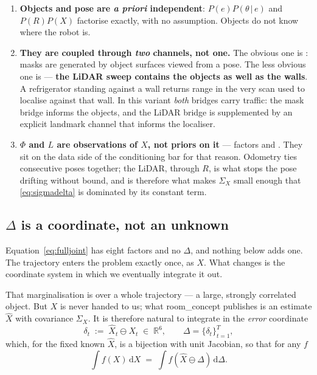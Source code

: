 \documentclass[11pt,a4paper]{report}
\newcommand{\given}{\,|\,}
\newcommand{\R}{\mathbb{R}}
\theoremstyle{definition}   %
\begin{document}
\begin{enumerate}[label=(\alph*),leftmargin=1.9em]
\item \textbf{Objects and pose are \emph{a priori} independent}: $P(e)P(\theta\given e)$ and
      $P(R)P(X)$ factorise exactly, with no assumption. Objects do not know where the robot is.
\item \textbf{They are coupled through \emph{two} channels, not one.} The obvious one is
      : masks are generated by object surfaces viewed from a pose. The less obvious one
      is  --- \textbf{the LiDAR sweep contains the objects as well as the walls}. A
      refrigerator standing against a wall returns range in the very scan used to localise
      against that wall. In this variant \emph{both} bridges carry traffic: the mask bridge
      informs the objects, and the LiDAR bridge is supplemented by an explicit landmark channel
      that informs the localiser.
\item \textbf{$\Phi$ and $L$ are observations of $X$, not priors on it} --- factors 
      and . They sit on the data side of the conditioning bar for that reason. Odometry
      ties consecutive poses together; the LiDAR, through $R$, is what stops the pose drifting
      without bound, and is therefore what makes $\Sigma_X$ small enough that
      \eqref{eq:sigmadelta} is dominated by its constant term.
\end{enumerate}

\subsection{$\Delta$ is a coordinate, not an unknown}
\label{sec:deltaisx}

Equation~\eqref{eq:fulljoint} has eight factors and no $\Delta$, and nothing below adds one. The
trajectory enters the problem exactly once, as $X$. What changes is the coordinate system in
which we eventually integrate it out.

That marginalisation is over a whole trajectory --- a large, strongly correlated object. But $X$
is never handed to us; what \textsf{room\_concept} publishes is an estimate $\hat X$ with
covariance $\Sigma_X$. It is therefore natural to integrate in the \emph{error} coordinate
\begin{equation}
\delta_t \;:=\; \hat X_t \ominus X_t \;\in\;\R^{6},
\qquad \Delta=\{\delta_t\}_{t=1}^{T},
\label{eq:deltadef}
\end{equation}
which, for the fixed known $\hat X$, is a bijection with unit Jacobian, so that for any $f$
\begin{equation}
\int f(X)\,\mathrm{d}X \;=\; \int f\!\left(\hat X\ominus\Delta\right)\,\mathrm{d}\Delta .
\label{eq:changeofvar}
\end{equation}
\end{document}
